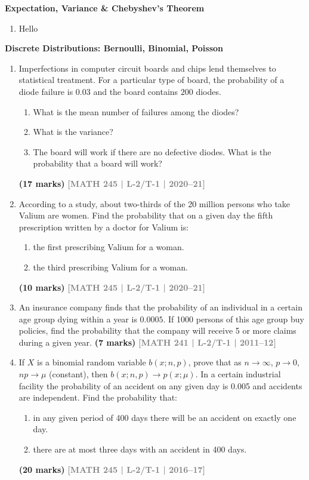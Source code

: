 \documentclass[12pt,a4paper]{article}
\newcommand{\yr}[1]{\hfill\textcolor{gray}{\small\textbf{[#1]}}}
\newcommand{\mk}[1]{\textcolor{orange!70!black}{\small\textbf{(#1 marks)}}}
\newcommand{\subtopic}[2]{%
  \vspace{10pt}
  \noindent\begin{tcolorbox}[colback=#1!8,colframe=#1,boxrule=0.6pt,arc=4pt,
    left=6pt,right=6pt,top=4pt,bottom=4pt]
    \small\bfseries\textcolor{#1}{#2}
  \end{tcolorbox}
  \vspace{2pt}
}
\begin{document}
\subtopic{cG}{Expectation, Variance \& Chebyshev's Theorem}

\label{sub:s8-expect}

\begin{enumerate}
\item Hello \end{enumerate}

\subtopic{cG}{Discrete Distributions: Bernoulli, Binomial, Poisson}
\label{sub:s8-discrete}

\begin{enumerate}

\item Imperfections in computer circuit boards and chips lend themselves to statistical treatment. For a particular type of board, the probability of a diode failure is $0.03$ and the board contains $200$ diodes.
\begin{enumerate}
  \item What is the mean number of failures among the diodes?
  \item What is the variance?
  \item The board will work if there are no defective diodes. What is the probability that a board will work?
\end{enumerate}
\mk{17} \yr{MATH 245 | L-2/T-1 | 2020--21}

\item According to a study, about two-thirds of the 20 million persons who take Valium are women. Find the probability that on a given day the fifth prescription written by a doctor for Valium is:
\begin{enumerate}
  \item the first prescribing Valium for a woman.
  \item the third prescribing Valium for a woman.
\end{enumerate}
\mk{10} \yr{MATH 245 | L-2/T-1 | 2020--21}

\item An insurance company finds that the probability of an individual in a certain age group dying within a year is $0.0005$. If 1000 persons of this age group buy policies, find the probability that the company will receive 5 or more claims during a given year.
\mk{7} \yr{MATH 241 | L-2/T-1 | 2011--12}

\item If $X$ is a binomial random variable $b(x;n,p)$, prove that as $n\to\infty$, $p\to 0$, $np\to\mu$ (constant), then $b(x;n,p)\to p(x;\mu)$. In a certain industrial facility the probability of an accident on any given day is 0.005 and accidents are independent. Find the probability that:
\begin{enumerate}
  \item in any given period of 400 days there will be an accident on exactly one day.
  \item there are at most three days with an accident in 400 days.
\end{enumerate}
\mk{20} \yr{MATH 245 | L-2/T-1 | 2016--17}


\end{enumerate}
\end{document}
